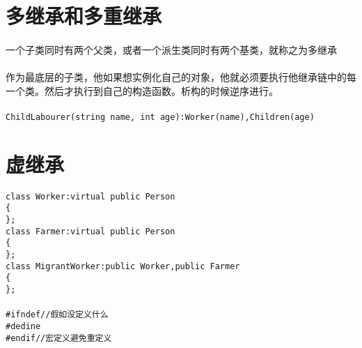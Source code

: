 \documentclass{article}
\begin{document}
\begin{CJK}{UTF8}{gbsn}
\section{多继承和多重继承}
\paragraph{}
一个子类同时有两个父类，或者一个派生类同时有两个基类，就称之为多继承
\paragraph{}
作为最底层的子类，他如果想实例化自己的对象，他就必须要执行他继承链中的每一个类。然后才执行到自己的构造函数。析构的时候逆序进行。
\paragraph{}
\begin{verbatim}
ChildLabourer(string name, int age):Worker(name),Children(age)
\end{verbatim}
\section{虚继承}
\begin{verbatim}
class Worker:virtual public Person
{
};
class Farmer:virtual public Person
{
};
class MigrantWorker:public Worker,public Farmer
{
};
\end{verbatim}
\paragraph{}
\begin{verbatim}
#ifndef//假如没定义什么
#dedine
#endif//宏定义避免重定义
\end{verbatim}
\end{CJK}
\end{document}
